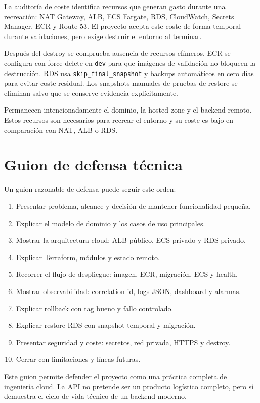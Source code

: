 La auditoría de coste identifica recursos que generan gasto durante una recreación: NAT Gateway, ALB, ECS Fargate, RDS, CloudWatch, Secrets Manager, ECR y Route 53. El proyecto acepta este coste de forma temporal durante validaciones, pero exige destruir el entorno al terminar.

Después del destroy se comprueba ausencia de recursos efímeros. ECR se configura con force delete en \texttt{dev} para que imágenes de validación no bloqueen la destrucción. RDS usa \texttt{skip\_final\_snapshot} y backups automáticos en cero días para evitar coste residual. Los snapshots manuales de pruebas de restore se eliminan salvo que se conserve evidencia explícitamente.

Permanecen intencionadamente el dominio, la hosted zone y el backend remoto. Estos recursos son necesarios para recrear el entorno y su coste es bajo en comparación con NAT, ALB o RDS.

\section{Guion de defensa técnica}
\label{sec:anexo-guion-defensa}

Un guion razonable de defensa puede seguir este orden:

\begin{enumerate}
  \item Presentar problema, alcance y decisión de mantener funcionalidad pequeña.
  \item Explicar el modelo de dominio y los casos de uso principales.
  \item Mostrar la arquitectura cloud: ALB público, ECS privado y RDS privado.
  \item Explicar Terraform, módulos y estado remoto.
  \item Recorrer el flujo de despliegue: imagen, ECR, migración, ECS y health.
  \item Mostrar observabilidad: correlation id, logs JSON, dashboard y alarmas.
  \item Explicar rollback con tag bueno y fallo controlado.
  \item Explicar restore RDS con snapshot temporal y migración.
  \item Presentar seguridad y coste: secretos, red privada, HTTPS y destroy.
  \item Cerrar con limitaciones y líneas futuras.
\end{enumerate}

Este guion permite defender el proyecto como una práctica completa de ingeniería cloud. La API no pretende ser un producto logístico completo, pero sí demuestra el ciclo de vida técnico de un backend moderno.


